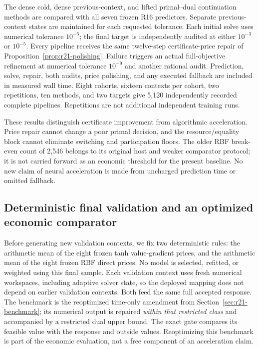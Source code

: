 The dense cold, dense previous-context, and lifted primal--dual continuation methods are compared with all seven frozen R16 predictors. Separate previous-context states are maintained for each requested tolerance. Each initial solve uses numerical tolerance $10^{-5}$; the final target is independently audited at either $10^{-3}$ or $10^{-5}$. Every pipeline receives the same twelve-step certificate-price repair of Proposition~\ref{prop:r21-polishing}. Failure triggers an actual full-objective refinement at numerical tolerance $10^{-9}$ and another rational audit. Prediction, solve, repair, both audits, price polishing, and any executed fallback are included in measured wall time. Eight cohorts, sixteen contexts per cohort, two repetitions, ten methods, and two targets give 5,120 independently recorded complete pipelines. Repetitions are not additional independent training runs.



These results distinguish certificate improvement from algorithmic acceleration. Price repair cannot change a poor primal decision, and the resource/equality block cannot eliminate switching and participation floors. The older RBF break-even count of 2,546 belongs to its original host and weaker comparator protocol; it is not carried forward as an economic threshold for the present baseline. No new claim of neural acceleration is made from uncharged prediction time or omitted fallback.

\subsection{Deterministic final validation and an optimized economic comparator}
Before generating new validation contexts, we fix two deterministic rules: the arithmetic mean of the eight frozen tanh value-gradient prices, and the arithmetic mean of the eight frozen RBF direct prices. No model is selected, refitted, or weighted using this final sample. Each validation context uses fresh numerical workspaces, including adaptive solver state, so the deployed mapping does not depend on earlier validation contexts. Both feed the same full accepted response. The benchmark is the reoptimized time-only amendment from Section~\ref{sec:r21-benchmark}; its numerical output is repaired \emph{within that restricted class} and accompanied by a restricted dual upper bound. The exact gate compares its feasible value with the response and outside values. Reoptimizing this benchmark is part of the economic evaluation, not a free component of an acceleration claim.

